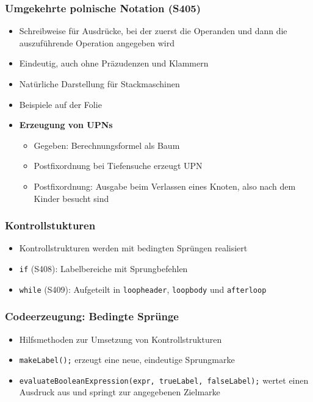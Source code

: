 \subsubsection{Umgekehrte polnische Notation (S405)}
\begin{itemize}
	\item Schreibweise für Ausdrücke, bei der zuerst die Operanden und dann die auszuführende Operation angegeben wird
	\item Eindeutig, auch ohne Präzudenzen und Klammern
	\item Natürliche Darstellung für Stackmaschinen
	\item Beispiele auf der Folie
	\item \textbf{Erzeugung von UPNs}
	\begin{itemize}
		\item Gegeben: Berechnungsformel als Baum
		\item Postfixordnung bei Tiefensuche erzeugt UPN
		\item Postfixordnung: Ausgabe beim Verlassen eines Knoten, also nach dem Kinder besucht sind
	\end{itemize}
\end{itemize}

\subsubsection{Kontrollstukturen}
\begin{itemize}
	\item Kontrollstrukturen werden mit bedingten Sprüngen realisiert
	\item \texttt{if} (S408): Labelbereiche mit Sprungbefehlen
	\item \texttt{while} (S409): Aufgeteilt in \texttt{loopheader}, \texttt{loopbody} und \texttt{afterloop}
\end{itemize}

\subsubsection{Codeerzeugung: Bedingte Sprünge}
\begin{itemize}
	\item Hilfsmethoden zur Umsetzung von Kontrollstrukturen
	\item \texttt{makeLabel();} erzeugt eine neue, eindeutige Sprungmarke
	\item \texttt{evaluateBooleanExpression(expr, trueLabel, falseLabel);} wertet einen Ausdruck aus und springt zur angegebenen Zielmarke
\end{itemize}



